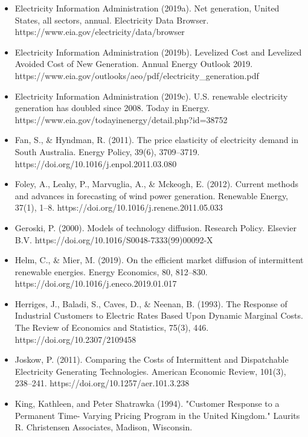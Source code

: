 \documentclass[aspectratio=169]{beamer}
\begin{document}
\begin{frame}[allowframebreaks]
\begin{itemize}
			\item Electricity Information Administration (2019a). Net generation, United States, all sectors, annual. Electricity Data Browser. https://www.eia.gov/electricity/data/browser
			
			\item Electricity Information Administration (2019b). Levelized Cost and Levelized Avoided Cost of New Generation. Annual Energy Outlook 2019. https://www.eia.gov/outlooks/aeo/pdf/electricity\_generation.pdf
			
			\item Electricity Information Administration (2019c). U.S. renewable electricity generation has doubled since 2008. Today in Energy. https://www.eia.gov/todayinenergy/detail.php?id=38752
			
			\item Fan, S., \& Hyndman, R. (2011). The price elasticity of electricity demand in South Australia. Energy Policy, 39(6), 3709–3719. https://doi.org/10.1016/j.enpol.2011.03.080
			
			\item Foley, A., Leahy, P., Marvuglia, A., \& Mckeogh, E. (2012). Current methods and advances in forecasting of wind power generation. Renewable Energy, 37(1), 1–8. https://doi.org/10.1016/j.renene.2011.05.033
			
			\item Geroski, P. (2000). Models of technology diffusion. Research Policy. Elsevier B.V. https://doi.org/10.1016/S0048-7333(99)00092-X
			
			\item Helm, C., \& Mier, M. (2019). On the efficient market diffusion of intermittent renewable energies. Energy Economics, 80, 812–830. https://doi.org/10.1016/j.eneco.2019.01.017
			
			\item Herriges, J., Baladi, S., Caves, D., \& Neenan, B. (1993). The Response of Industrial Customers to Electric Rates Based Upon Dynamic Marginal Costs. The Review of Economics and Statistics, 75(3), 446. https://doi.org/10.2307/2109458
			
			\item Joskow, P. (2011). Comparing the Costs of Intermittent and Dispatchable Electricity Generating Technologies. American Economic Review, 101(3), 238–241. https://doi.org/10.1257/aer.101.3.238
			
			\item King, Kathleen, and Peter Shatrawka (1994). "Customer Response to a Permanent Time- Varying
			Pricing Program in the United Kingdom." Laurits R. Christensen Associates, Madison,
			Wisconsin.
			

\end{itemize}
\end{frame}
\end{document}
